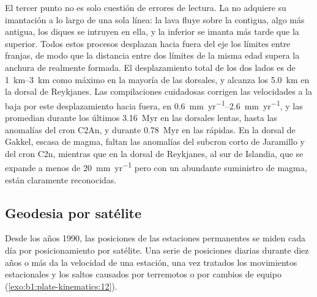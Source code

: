 El tercer punto no es solo cuestión de errores de lectura. La  no adquiere su imantación a lo largo de una sola línea: la lava
fluye sobre la  contigua, algo más antigua, los diques se intruyen en ella, y la  inferior se imanta más tarde que la
superior. Todos estos procesos desplazan hacia fuera del eje los límites entre franjas, de modo que la distancia entre dos límites de
la misma edad supera la anchura de  realmente formada. El desplazamiento total de los dos lados es de \qtyrange{1}{3}{km} como
máximo en la mayoría de las dorsales, y alcanza los \qty{5.0}{km} en la dorsal de Reykjanes. Las compilaciones cuidadosas corrigen las
velocidades a la baja por este desplazamiento hacia fuera, en \qtyrange{0.6}{2.6}{mm.yr^{-1}}, y las promedian durante los últimos
\qty{3.16}{Myr} en las dorsales lentas, hasta las anomalías del cron C2An, y durante \qty{0.78}{Myr} en las rápidas. En la dorsal de
Gakkel, escasa de magma, faltan las anomalías del subcron corto de Jaramillo y del cron C2n, mientras que en la dorsal de Reykjanes, al
sur de Islandia, que se expande a menos de \qty{20}{mm.yr^{-1}} pero con un abundante suministro de magma, están claramente reconocidas.

\subsection*{Geodesia por satélite}

Desde los años 1990, las posiciones de las estaciones permanentes se miden cada día por posicionamiento por satélite. Una serie de
posiciones diarias durante diez años o más da la velocidad de una estación, una vez tratados los movimientos estacionales y los saltos
causados por terremotos o por cambios de equipo (\cref{exo:b1:plate-kinematics:12}).

